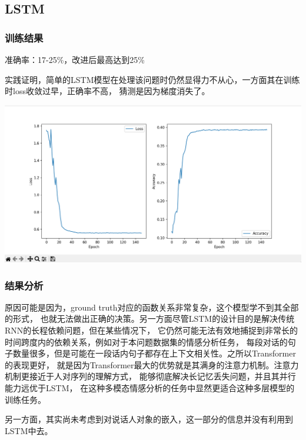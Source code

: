 \documentclass[11pt]{article}
\begin{document}
        \subsection{LSTM}
            \subsubsection{训练结果}
            准确率：17-25\%，改进后最高达到25\%
            
            
            实践证明，简单的LSTM模型在处理该问题时仍然显得力不从心，一方面其在训练时loss收敛过早，正确率不高，
            猜测是因为梯度消失了。
            \begin{center}
                \includegraphics[scale=0.5]{graph/result4.png}
            \end{center}

            \subsubsection{结果分析}
            原因可能是因为，ground truth对应的函数关系非常复杂，这个模型学不到其全部的形式，
            也就无法做出正确的决策。另一方面尽管LSTM的设计目的是解决传统RNN的长程依赖问题，但在某些情况下，
            它仍然可能无法有效地捕捉到非常长的时间跨度内的依赖关系，例如对于本问题数据集的情感分析任务，
            每段对话的句子数量很多，但是可能在一段话内句子都存在上下文相关性。之所以Transformer的表现更好，
            就是因为Transformer最大的优势就是其满身的注意力机制。注意力机制更接近于人对序列的理解方式，
            能够彻底解决长记忆丢失问题，并且其并行能力远优于LSTM，
            在这种多模态情感分析的任务中显然更适合这种多层模型的训练任务。

            另一方面，其实尚未考虑到对说话人对象的嵌入，这一部分的信息并没有利用到LSTM中去。
            
\end{document}
